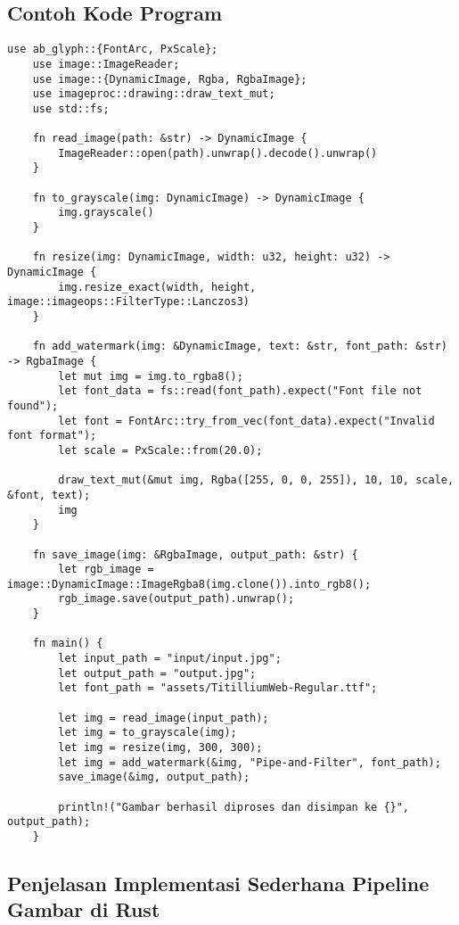 \subsection{Contoh Kode Program}

\begin{lstlisting}[style=RustStyle, caption={Implementasi pipeline pemrosesan gambar dengan filter Grayscale, Resize, dan Watermark}, label=lst:pipeline-rust]
	use ab_glyph::{FontArc, PxScale};
	use image::ImageReader;
	use image::{DynamicImage, Rgba, RgbaImage};
	use imageproc::drawing::draw_text_mut;
	use std::fs;
	
	fn read_image(path: &str) -> DynamicImage {
		ImageReader::open(path).unwrap().decode().unwrap()
	}
	
	fn to_grayscale(img: DynamicImage) -> DynamicImage {
		img.grayscale()
	}
	
	fn resize(img: DynamicImage, width: u32, height: u32) -> DynamicImage {
		img.resize_exact(width, height, image::imageops::FilterType::Lanczos3)
	}
	
	fn add_watermark(img: &DynamicImage, text: &str, font_path: &str) -> RgbaImage {
		let mut img = img.to_rgba8();
		let font_data = fs::read(font_path).expect("Font file not found");
		let font = FontArc::try_from_vec(font_data).expect("Invalid font format");
		let scale = PxScale::from(20.0);
		
		draw_text_mut(&mut img, Rgba([255, 0, 0, 255]), 10, 10, scale, &font, text);
		img
	}
	
	fn save_image(img: &RgbaImage, output_path: &str) {
		let rgb_image = image::DynamicImage::ImageRgba8(img.clone()).into_rgb8();
		rgb_image.save(output_path).unwrap();
	}
	
	fn main() {
		let input_path = "input/input.jpg";
		let output_path = "output.jpg";
		let font_path = "assets/TitilliumWeb-Regular.ttf";
		
		let img = read_image(input_path);
		let img = to_grayscale(img);
		let img = resize(img, 300, 300);
		let img = add_watermark(&img, "Pipe-and-Filter", font_path);
		save_image(&img, output_path);
		
		println!("Gambar berhasil diproses dan disimpan ke {}", output_path);
	}
\end{lstlisting}

\subsection{Penjelasan Implementasi Sederhana Pipeline Gambar di Rust}

